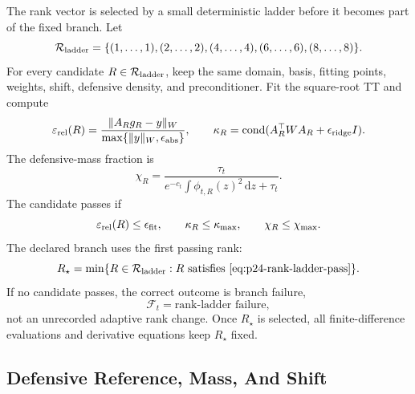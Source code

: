 \documentclass[11pt]{article}
\numberwithin{equation}{section}
\newcommand{\dd}{\,\mathrm d}
\begin{document}
The rank vector is selected by a small deterministic ladder before it becomes
part of the fixed branch.  Let
\begin{equation}
    \mathcal R_{\rm ladder}
    =
    \{(1,\ldots,1),(2,\ldots,2),(4,\ldots,4),(6,\ldots,6),(8,\ldots,8)\}.
    \label{eq:p24-rank-ladder}
\end{equation}
For every candidate \(R\in\mathcal R_{\rm ladder}\), keep the same domain,
basis, fitting points, weights, shift, defensive density, and preconditioner.
Fit the square-root TT and compute
\begin{equation}
    \varepsilon_{\rm rel}(R)
    =
    \frac{\|A_R g_R-y\|_W}{\max\{\|y\|_W,\epsilon_{\rm abs}\}},
    \qquad
    \kappa_R
    =
    \operatorname{cond}(A_R^\top W A_R+\epsilon_{\rm ridge}I).
    \label{eq:p24-rank-ladder-residual}
\end{equation}
The defensive-mass fraction is
\begin{equation}
    \chi_R
    =
    \frac{\tau_t}
         {e^{-c_t}\int \phi_{t,R}(z)^2\dd z+\tau_t}.
    \label{eq:p24-rank-ladder-defense}
\end{equation}
The candidate passes if
\begin{equation}
    \varepsilon_{\rm rel}(R)\le \epsilon_{\rm fit},
    \qquad
    \kappa_R\le \kappa_{\max},
    \qquad
    \chi_R\le \chi_{\max}.
    \label{eq:p24-rank-ladder-pass}
\end{equation}
The declared branch uses the first passing rank:
\begin{equation}
    R_\star=\min\{R\in\mathcal R_{\rm ladder}:R\text{ satisfies }
    \eqref{eq:p24-rank-ladder-pass}\}.
    \label{eq:p24-rank-ladder-choice}
\end{equation}
If no candidate passes, the correct outcome is branch failure,
\begin{equation}
    \mathcal F_t=\text{rank-ladder failure},
    \label{eq:p24-rank-ladder-failure}
\end{equation}
not an unrecorded adaptive rank change.  Once \(R_\star\) is selected, all
finite-difference evaluations and derivative equations keep \(R_\star\) fixed.

\subsection{Defensive Reference, Mass, And Shift}
\end{document}
